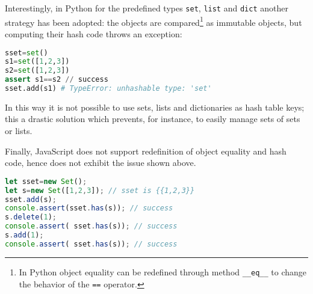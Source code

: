 Interestingly, in Python for the predefined types \lstinline{set}, \lstinline{list} and \lstinline{dict} another strategy has been adopted: the objects are compared\footnote{In Python object equality can be redefined through method \lstinline{__eq__} to change the behavior of the \lstinline{==} operator.} as
immutable objects, but computing their hash code throws an exception:
\begin{lstlisting}[language=Python]
sset=set()                                                           
s1=set([1,2,3])
s2=set([1,2,3])
assert s1==s2 // success
sset.add(s1) # TypeError: unhashable type: 'set'       
\end{lstlisting}
In this way it is not possible to use sets, lists and dictionaries as hash table keys; this a drastic solution which prevents, for instance, to easily manage sets of sets or lists. 

Finally, JavaScript does not support redefinition of object equality and hash code, hence does not exhibit the issue shown above. 
\begin{lstlisting}[language=Javascript]
let sset=new Set();                                                           
let s=new Set([1,2,3]); // sset is {{1,2,3}}                                                         
sset.add(s);
console.assert(sset.has(s)); // success
s.delete(1);
console.assert( sset.has(s)); // success
s.add(1);
console.assert( sset.has(s)); // success
\end{lstlisting}
